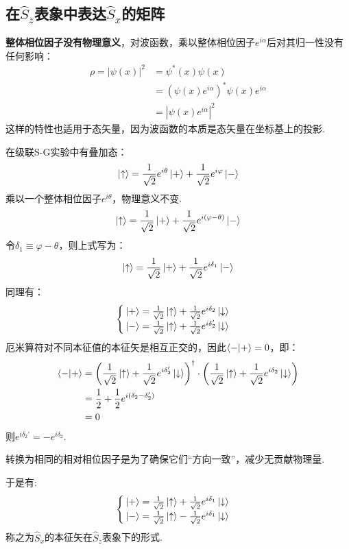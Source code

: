 \subsection{在\texorpdfstring{$\hat{S}_z$}{Sz}表象中表达\texorpdfstring{$\hat{S}_x$}{Sx}的矩阵}
\textbf{整体相位因子没有物理意义}，对波函数，乘以整体相位因子$e^{i\alpha}$后对其归一性没有任何影响：
\begin{align*}
    \rho = |\psi(x)|^2 &= \psi^*(x)\psi(x) \\
    &= (\psi(x)e^{i\alpha})^* \psi(x)e^{i\alpha} \\\
    &= |\psi(x)e^{i\alpha}|^2
\end{align*}
这样的特性也适用于态矢量，因为波函数的本质是态矢量在坐标基上的投影.
\begin{derivation}
    在级联S-G实验中有叠加态：
    $$\ket{\uparrow} = \frac{1}{\sqrt{2}} e^{i\theta} \ket{+} + \frac{1}{\sqrt{2}} e^{i\varphi} \ket{-}$$
    乘以一个整体相位因子$e^{i\theta}$，物理意义不变.
    $$\ket{\uparrow} = \frac{1}{\sqrt{2}} \ket{+} + \frac{1}{\sqrt{2}} e^{i(\varphi-\theta)} \ket{-}$$
    令$\delta_1 \equiv \varphi  - \theta$，则上式写为：
    $$\ket{\uparrow} = \frac{1}{\sqrt{2}} \ket{+} + \frac{1}{\sqrt{2}} e^{i\delta_1} \ket{-}$$
    同理有：
    $$\begin{cases} \ket{+} = \frac{1}{\sqrt{2}} \ket{\uparrow} + \frac{1}{\sqrt{2}} e^{i\delta_2} \ket{\downarrow} \\ \ket{-} = \frac{1}{\sqrt{2}} \ket{\uparrow} + \frac{1}{\sqrt{2}} e^{i\delta_2'} \ket{\downarrow} \end{cases}$$
    厄米算符对不同本征值的本征矢是相互正交的，因此$\braket{-}{+}=0$，即：
    \begin{align*}
        \braket{-}{+} &= \left( \frac{1}{\sqrt{2}} \ket{\uparrow} + \frac{1}{\sqrt{2}} e^{i\delta_2'} \ket{\downarrow} \right)^{\dagger} \cdot \left( \frac{1}{\sqrt{2}} \ket{\uparrow} + \frac{1}{\sqrt{2}} e^{i\delta_2} \ket{\downarrow} \right) \\
        &= \frac{1}{2} + \frac{1}{2} e^{i(\delta_2 - \delta_2')} \\
        &= 0
    \end{align*}
    则$e^{i\delta_2'} = -e^{i\delta_2}$.
    
    转换为相同的相对相位因子是为了确保它们“方向一致”，减少无贡献物理量.

    于是有:
    $$\begin{cases} \ket{+} = \frac{1}{\sqrt{2}} \ket{\uparrow} + \frac{1}{\sqrt{2}} e^{i\delta_1} \ket{\downarrow} \\ \ket{-} = \frac{1}{\sqrt{2}} \ket{\uparrow} - \frac{1}{\sqrt{2}} e^{i\delta_1} \ket{\downarrow} \end{cases}$$
    称之为$\hat{S}_x$的本征矢在$\hat{S}_z$表象下的形式.


\end{derivation}
